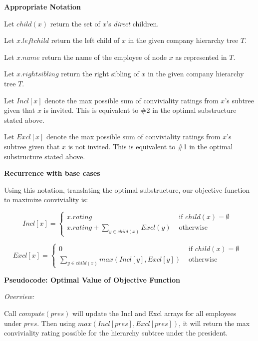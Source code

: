 \documentclass[a4paper]{report}
\begin{document}
\begin{enumerate}
      {\bf Appropriate Notation}

      Let $child(x)$ return the set of $x$'s {\it direct} children. 

      Let $x.leftchild$ return the left child of $x$ in the given company hierarchy tree $T$.

      Let $x.name$ return the name of the employee of node $x$ as represented in $T$.

      Let $x.rightsibling$ return the right sibling of $x$ in the given company hierarchy tree $T$.

      Let $Incl[x]$ denote the max possible sum of conviviality ratings from $x$'s subtree given that $x$ is invited. This is equivalent to \#2 in the optimal substructure
      stated above. 

      Let $Excl[x]$ denote the max possible sum of conviviality ratings from $x$'s subtree given that $x$ is not invited. This is equivalent to \#1 in the optimal substructure
      stated above. 

      {\bf Recurrence with base cases}

      Using this notation, translating the optimal substructure, our objective function to maximize conviviality is:


      \begin{displaymath}
        Incl[x] = \left\{
          \begin{array}{lr}
            x.rating & \text{ if $child(x) = \emptyset$ }\\
            x.rating + \sum_{y \in child(x)} Excl(y)  & \text{ otherwise }
          \end{array}
          \right.
        \end{displaymath} 

      \begin{displaymath}
      Excl[x] = \left\{
        \begin{array}{lr}
          0 & \text{ if $child(x) = \emptyset$ }\\
          \sum_{y \in child(x)} max( Incl[y], Excl[y])   & \text{ otherwise }
        \end{array}
        \right.
      \end{displaymath} 


      {\bf Pseudocode: Optimal Value of Objective Function}

      {\it Overview:}

      Call $compute(pres)$ will update the Incl and Excl arrays for all employees under $pres$. 
      Then using $max(Incl[pres], Excl[pres])$, it will return the max conviviality rating possible for the hierarchy subtree under the president.


\end{enumerate}
\end{document}
